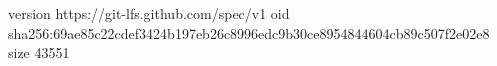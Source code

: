 version https://git-lfs.github.com/spec/v1
oid sha256:69ae85c22cdef3424b197eb26c8996edc9b30ce8954844604cb89c507f2e02e8
size 43551
